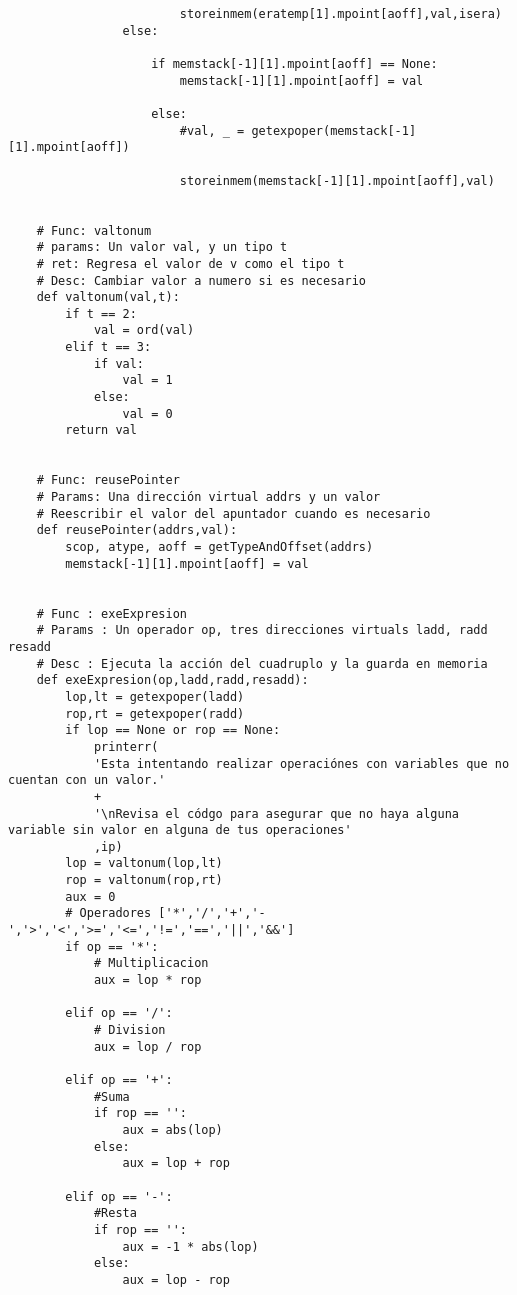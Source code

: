 \documentclass[krantz1,ChapterTOCs, spanish]{krantz}
\begin{document}
\begin{verbatim}
                        storeinmem(eratemp[1].mpoint[aoff],val,isera)
                else:
                    
                    if memstack[-1][1].mpoint[aoff] == None:
                        memstack[-1][1].mpoint[aoff] = val
                        
                    else:
                        #val, _ = getexpoper(memstack[-1][1].mpoint[aoff])
                        
                        storeinmem(memstack[-1][1].mpoint[aoff],val)
                        
                        
    # Func: valtonum
    # params: Un valor val, y un tipo t
    # ret: Regresa el valor de v como el tipo t
    # Desc: Cambiar valor a numero si es necesario
    def valtonum(val,t):
        if t == 2:
            val = ord(val)
        elif t == 3:
            if val:
                val = 1
            else:
                val = 0
        return val
    
    
    # Func: reusePointer
    # Params: Una dirección virtual addrs y un valor 
    # Reescribir el valor del apuntador cuando es necesario
    def reusePointer(addrs,val):
        scop, atype, aoff = getTypeAndOffset(addrs)
        memstack[-1][1].mpoint[aoff] = val
    
    
    # Func : exeExpresion
    # Params : Un operador op, tres direcciones virtuals ladd, radd resadd
    # Desc : Ejecuta la acción del cuadruplo y la guarda en memoria
    def exeExpresion(op,ladd,radd,resadd):
        lop,lt = getexpoper(ladd)
        rop,rt = getexpoper(radd)
        if lop == None or rop == None:
            printerr(
            'Esta intentando realizar operaciónes con variables que no cuentan con un valor.'
            +
            '\nRevisa el códgo para asegurar que no haya alguna variable sin valor en alguna de tus operaciones'
            ,ip)
        lop = valtonum(lop,lt)
        rop = valtonum(rop,rt)
        aux = 0
        # Operadores ['*','/','+','-','>','<','>=','<=','!=','==','||','&&']
        if op == '*': 
            # Multiplicacion
            aux = lop * rop
    
        elif op == '/': 
            # Division
            aux = lop / rop
    
        elif op == '+': 
            #Suma 
            if rop == '':
                aux = abs(lop)
            else:
                aux = lop + rop
    
        elif op == '-': 
            #Resta
            if rop == '':
                aux = -1 * abs(lop)
            else:
                aux = lop - rop
    

\end{verbatim}
\end{document}
